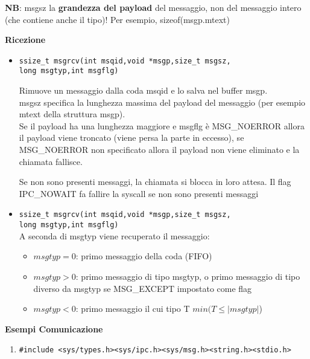 \begin{flushleft}
\begin{flushleft}
    \textbf{NB}: msgsz \ace la \textbf{grandezza del payload} del messaggio, non del messaggio intero (che 
    contiene anche il tipo)! Per esempio, sizeof(msgp.mtext)
  \end{flushleft}
  \begin{flushleft}
    \textbf{Ricezione}\par 
    \begin{itemize}
      \item \begin{flushleft}
        \texttt{ssize\_t msgrcv(int msqid,void *msgp,size\_t msgsz,\\ 
                \tab \tab  \tab long msgtyp,int msgflg)}
      \end{flushleft}
      Rimuove un messaggio dalla coda msqid e lo salva nel buffer msgp. \\
      msgsz specifica la lunghezza massima del payload del messaggio (per esempio mtext della 
      struttura msgp).\\
      Se il payload ha una lunghezza maggiore e msgflg è MSG\_NOERROR allora il payload viene troncato
      (viene persa la parte in eccesso), se MSG\_NOERROR non \ace specificato allora il payload non viene
      eliminato e la chiamata fallisce.\par
      Se non sono presenti messaggi, la chiamata si blocca in loro attesa. Il flag 
      IPC\_NOWAIT fa fallire la syscall se non sono presenti messaggi
      \item \texttt{ssize\_t msgrcv(int msqid,void *msgp,size\_t msgsz,\\
                    \tab \tab \tab long msgtyp,int msgflg)}\\
            A seconda di msgtyp viene recuperato il messaggio:
            \begin{itemize}
              \item $msgtyp = 0$: primo messaggio della coda (FIFO)
              \item $msgtyp > 0$: primo messaggio di tipo msgtyp, o primo messaggio di tipo 
                    diverso da msgtyp se MSG\_EXCEPT \ace impostato come flag
              \item $msgtyp < 0$: primo messaggio il cui tipo T \ace $min(T \leq |msgtyp|$)
            \end{itemize}                    
    \end{itemize}   
    \textbf{Esempi Comunicazione}
    \begin{enumerate}
      \item \texttt{\#include <sys/types.h><sys/ipc.h><sys/msg.h><string.h><stdio.h> \\
}
\end{enumerate}
\end{flushleft}
\end{flushleft}
